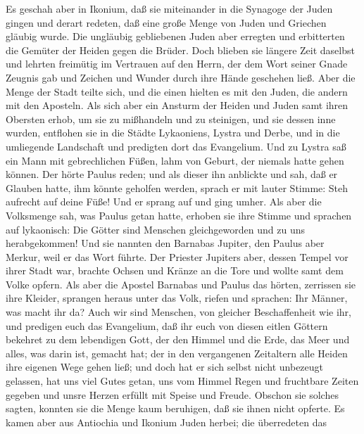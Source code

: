  Es geschah aber in Ikonium, daß sie miteinander in die
Synagoge der Juden gingen und derart redeten, daß eine große Menge von
Juden und Griechen gläubig wurde.  Die ungläubig
gebliebenen Juden aber erregten und erbitterten die Gemüter der Heiden
gegen die Brüder.  Doch blieben sie längere Zeit daselbst
und lehrten freimütig im Vertrauen auf den Herrn, der dem Wort seiner
Gnade Zeugnis gab und Zeichen und Wunder durch ihre Hände geschehen
ließ.  Aber die Menge der Stadt teilte sich, und die einen
hielten es mit den Juden, die andern mit den Aposteln. 
Als sich aber ein Ansturm der Heiden und Juden samt ihren Obersten
erhob, um sie zu mißhandeln und zu steinigen,  und sie
dessen inne wurden, entflohen sie in die Städte Lykaoniens, Lystra und
Derbe, und in die umliegende Landschaft  und predigten
dort das Evangelium.  Und zu Lystra saß ein Mann mit
gebrechlichen Füßen, lahm von Geburt, der niemals hatte gehen können.
 Der hörte Paulus reden; und als dieser ihn anblickte und
sah, daß er Glauben hatte, ihm könnte geholfen werden, 
sprach er mit lauter Stimme: Steh aufrecht auf deine Füße! Und er sprang
auf und ging umher.  Als aber die Volksmenge sah, was
Paulus getan hatte, erhoben sie ihre Stimme und sprachen auf lykaonisch:
Die Götter sind Menschen gleichgeworden und zu uns herabgekommen!
 Und sie nannten den Barnabas Jupiter, den Paulus aber
Merkur, weil er das Wort führte.  Der Priester Jupiters
aber, dessen Tempel vor ihrer Stadt war, brachte Ochsen und Kränze an
die Tore und wollte samt dem Volke opfern.  Als aber die
Apostel Barnabas und Paulus das hörten, zerrissen sie ihre Kleider,
sprangen heraus unter das Volk, riefen und sprachen:  Ihr
Männer, was macht ihr da? Auch wir sind Menschen, von gleicher
Beschaffenheit wie ihr, und predigen euch das Evangelium, daß ihr euch
von diesen eitlen Göttern bekehret zu dem lebendigen Gott, der den
Himmel und die Erde, das Meer und alles, was darin ist, gemacht hat;
 der in den vergangenen Zeitaltern alle Heiden ihre
eigenen Wege gehen ließ;  und doch hat er sich selbst
nicht unbezeugt gelassen, hat uns viel Gutes getan, uns vom Himmel Regen
und fruchtbare Zeiten gegeben und unsre Herzen erfüllt mit Speise und
Freude.  Obschon sie solches sagten, konnten sie die
Menge kaum beruhigen, daß sie ihnen nicht opferte.  Es
kamen aber aus Antiochia und Ikonium Juden herbei; die überredeten das

